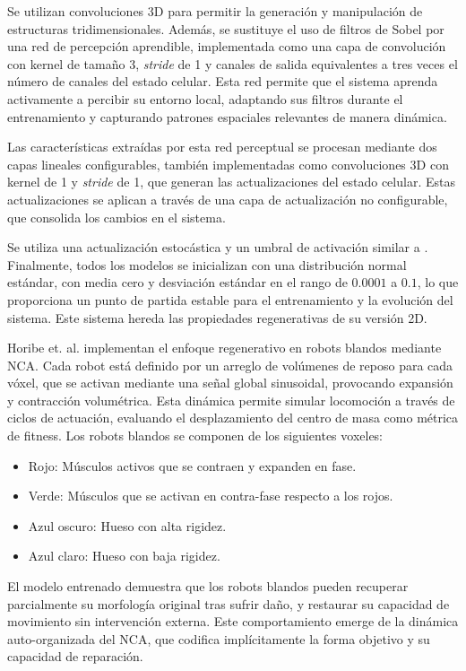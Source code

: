 Se utilizan convoluciones 3D para permitir la generación y manipulación de estructuras tridimensionales. Además, se sustituye el uso de filtros de Sobel por una red de percepción aprendible, implementada como una capa de convolución con kernel de tamaño 3, \textit{stride} de 1 y canales de salida equivalentes a tres veces el número de canales del estado celular. Esta red permite que el sistema aprenda activamente a percibir su entorno local, adaptando sus filtros durante el entrenamiento y capturando patrones espaciales relevantes de manera dinámica.

Las características extraídas por esta red perceptual se procesan mediante dos capas lineales configurables, también implementadas como convoluciones 3D con kernel de 1 y \textit{stride} de 1, que generan las actualizaciones del estado celular. Estas actualizaciones se aplican a través de una capa de actualización no configurable, que consolida los cambios en el sistema.

Se utiliza una actualización estocástica y un umbral de activación similar a \cite{mordvintsevNCA}. Finalmente, todos los modelos se inicializan con una distribución normal estándar, con media cero y desviación estándar en el rango de $0.0001$ a $0.1$, lo que proporciona un punto de partida estable para el entrenamiento y la evolución del sistema. Este sistema hereda las propiedades regenerativas de su versión 2D.

Horibe et. al. \cite{horibe} implementan el enfoque regenerativo en robots blandos mediante NCA. Cada robot está definido por un arreglo de volúmenes de reposo para cada vóxel, que se activan mediante una señal global sinusoidal, provocando expansión y contracción volumétrica. Esta dinámica permite simular locomoción a través de ciclos de actuación, evaluando el desplazamiento del centro de masa como métrica de fitness. Los robots blandos se componen de los siguientes voxeles:
\begin{itemize}
	\item Rojo: Músculos activos que se contraen y expanden en fase.
	\item Verde: Músculos que se activan en contra-fase respecto a los rojos.
	\item Azul oscuro: Hueso con alta rigidez.
	\item Azul claro: Hueso con baja rigidez.
\end{itemize}

El modelo entrenado demuestra que los robots blandos pueden recuperar parcialmente su morfología original tras sufrir daño, y restaurar su capacidad de movimiento sin intervención externa. Este comportamiento emerge de la dinámica auto-organizada del NCA, que codifica implícitamente la forma objetivo y su capacidad de reparación.

